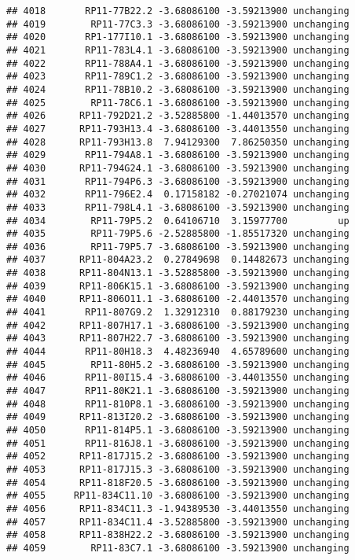 \documentclass[]{article}
\begin{document}
\begin{verbatim}
## 4018       RP11-77B22.2 -3.68086100 -3.59213900 unchanging
## 4019        RP11-77C3.3 -3.68086100 -3.59213900 unchanging
## 4020       RP1-177I10.1 -3.68086100 -3.59213900 unchanging
## 4021       RP11-783L4.1 -3.68086100 -3.59213900 unchanging
## 4022       RP11-788A4.1 -3.68086100 -3.59213900 unchanging
## 4023       RP11-789C1.2 -3.68086100 -3.59213900 unchanging
## 4024       RP11-78B10.2 -3.68086100 -3.59213900 unchanging
## 4025        RP11-78C6.1 -3.68086100 -3.59213900 unchanging
## 4026      RP11-792D21.2 -3.52885800 -1.44013570 unchanging
## 4027      RP11-793H13.4 -3.68086100 -3.44013550 unchanging
## 4028      RP11-793H13.8  7.94129300  7.86250350 unchanging
## 4029       RP11-794A8.1 -3.68086100 -3.59213900 unchanging
## 4030      RP11-794G24.1 -3.68086100 -3.59213900 unchanging
## 4031       RP11-794P6.3 -3.68086100 -3.59213900 unchanging
## 4032       RP11-796E2.4  0.17158182 -0.27021074 unchanging
## 4033       RP11-798L4.1 -3.68086100 -3.59213900 unchanging
## 4034        RP11-79P5.2  0.64106710  3.15977700         up
## 4035        RP11-79P5.6 -2.52885800 -1.85517320 unchanging
## 4036        RP11-79P5.7 -3.68086100 -3.59213900 unchanging
## 4037      RP11-804A23.2  0.27849698  0.14482673 unchanging
## 4038      RP11-804N13.1 -3.52885800 -3.59213900 unchanging
## 4039      RP11-806K15.1 -3.68086100 -3.59213900 unchanging
## 4040      RP11-806O11.1 -3.68086100 -2.44013570 unchanging
## 4041       RP11-807G9.2  1.32912310  0.88179230 unchanging
## 4042      RP11-807H17.1 -3.68086100 -3.59213900 unchanging
## 4043      RP11-807H22.7 -3.68086100 -3.59213900 unchanging
## 4044       RP11-80H18.3  4.48236940  4.65789600 unchanging
## 4045        RP11-80H5.2 -3.68086100 -3.59213900 unchanging
## 4046       RP11-80I15.4 -3.68086100 -3.44013550 unchanging
## 4047       RP11-80K21.1 -3.68086100 -3.59213900 unchanging
## 4048       RP11-810P8.1 -3.68086100 -3.59213900 unchanging
## 4049      RP11-813I20.2 -3.68086100 -3.59213900 unchanging
## 4050       RP11-814P5.1 -3.68086100 -3.59213900 unchanging
## 4051       RP11-816J8.1 -3.68086100 -3.59213900 unchanging
## 4052      RP11-817J15.2 -3.68086100 -3.59213900 unchanging
## 4053      RP11-817J15.3 -3.68086100 -3.59213900 unchanging
## 4054      RP11-818F20.5 -3.68086100 -3.59213900 unchanging
## 4055     RP11-834C11.10 -3.68086100 -3.59213900 unchanging
## 4056      RP11-834C11.3 -1.94389530 -3.44013550 unchanging
## 4057      RP11-834C11.4 -3.52885800 -3.59213900 unchanging
## 4058      RP11-838H22.2 -3.68086100 -3.59213900 unchanging
## 4059        RP11-83C7.1 -3.68086100 -3.59213900 unchanging

\end{verbatim}
\end{document}
